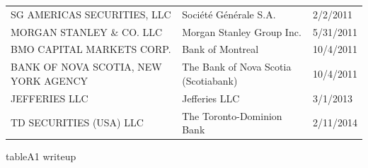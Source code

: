 \documentclass{article}
\begin{document}
\begin{adjustbox}{max width=\textwidth}
\begin{tabular}{lll}
SG AMERICAS SECURITIES, LLC & Société Générale S.A. & 2/2/2011 \\
MORGAN STANLEY \& CO. LLC & Morgan Stanley Group Inc. & 5/31/2011 \\
BMO CAPITAL MARKETS CORP.  & Bank of Montreal & 10/4/2011 \\
BANK OF NOVA SCOTIA, NEW YORK AGENCY & The Bank of Nova Scotia (Scotiabank) & 10/4/2011 \\
JEFFERIES LLC & Jefferies LLC & 3/1/2013 \\
TD SECURITIES (USA) LLC & The Toronto-Dominion Bank & 2/11/2014 \\
\bottomrule
\end{tabular}
\end{adjustbox}

\par
tableA1 writeup\par
\end{document}
